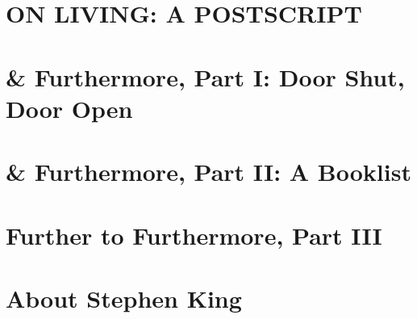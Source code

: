\documentclass{article}
\numberwithin{equation}{section}
\begin{document}

\section{ON LIVING: A POSTSCRIPT}


\section{\& Furthermore, Part I: Door Shut, Door Open}


\section{\& Furthermore, Part II: A Booklist}


\section{Further to Furthermore, Part III}


\section{About Stephen King}


\printbibliography[heading=bibintoc]
	
\end{document}
